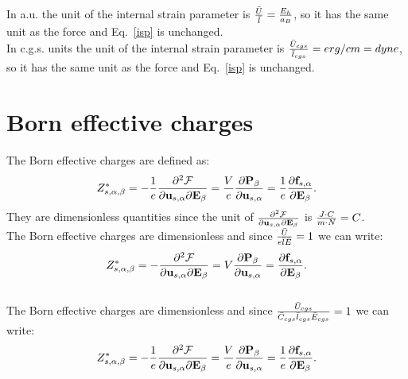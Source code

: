 \documentclass[12pt,a4paper]{article}
\begin{document}
{\color{web-blue} In a.u. the unit of the internal strain parameter is
${\bar U \over \bar l}={E_h \over a_B}$, so it has the same unit as the force
and Eq.~\ref{isp} is unchanged.
}
\\

{\color{orange} In c.g.s. units the unit of the internal strain parameter is
${\bar U_{cgs} \over \bar l_{cgs}}=erg/cm=dyne$, so it has the same unit 
as the force and Eq.~\ref{isp} is unchanged.
}

\newpage
\section{\color{coral}Born effective charges}
The Born effective charges are defined as:
\begin{equation}
Z^*_{s,\alpha,\beta}=-{1\over e} {\partial^2 \mathcal{F} \over \partial 
{\bf u}_{s,\alpha} \partial {\bf E}_{\beta}}={V\over e} {
\partial {\bf P}_{\beta} \over \partial 
{\bf u}_{s,\alpha}}={1\over e} {\partial {\bf f}_{s,\alpha} 
\over \partial {\bf E}_{\beta}}.
\end{equation}
They are dimensionless quantities since the unit of 
${\partial^2 \mathcal{F} \over \partial 
{\bf u}_{s,\alpha} \partial {\bf E}_{\beta}}$ is ${J \cdot C \over m\cdot N}=
C$.
\\

{\color{web-blue} The Born effective charges are dimensionless 
and since 
${\bar U \over e \bar l \bar E}=1$ we can write:
\begin{equation}
Z^*_{s,\alpha,\beta}=-{\partial^2 \mathcal{F} \over \partial 
{\bf u}_{s,\alpha} \partial {\bf E}_{\beta}} 
=V {
\partial {\bf P}_{\beta} \over \partial 
{\bf u}_{s,\alpha}}={\partial {\bf f}_{s,\alpha} 
\over \partial {\bf E}_{\beta}}.
\end{equation}
}
\\

{\color{orange} The Born effective charges are dimensionless
and since 
${\bar U_{cgs} \over \bar C_{cgs} \bar l_{cgs} \bar E_{cgs}}=1$ we can write:
\begin{equation}
Z^*_{s,\alpha,\beta}=-{1\over e}{\partial^2 \mathcal{F} \over \partial 
{\bf u}_{s,\alpha} \partial {\bf E}_{\beta}}={V\over e} {
\partial {\bf P}_{\beta} \over \partial 
{\bf u}_{s,\alpha}}={1\over e} {\partial {\bf f}_{s,\alpha} 
\over \partial {\bf E}_{\beta}}.
\end{equation}
}

\newpage
\end{document}
